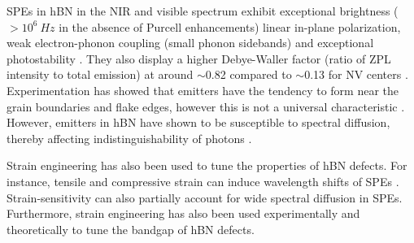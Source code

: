 \documentclass[]{article}
\begin{document}
SPEs in hBN in the NIR and visible spectrum exhibit exceptional brightness ($> 10^6  \ Hz$ in the absence of Purcell enhancements) linear in-plane polarization, weak electron-phonon coupling (small phonon sidebands) and exceptional photostability \cite{SP_sources_atomically_thin_materials_review}. They also display a higher Debye-Waller factor (ratio of ZPL intensity to total emission) at around $\sim$0.82 compared to $\sim$0.13 for NV centers \cite{2D_materials_for_quantum_information_science}. Experimentation has showed that emitters have the tendency to form near the grain boundaries and flake edges, however this is not a universal characteristic \cite{SP_sources_atomically_thin_materials_review}. However, emitters in hBN have shown to be susceptible to spectral diffusion, thereby affecting indistinguishability of photons \cite{SP_sources_atomically_thin_materials_review}.
\newline


Strain engineering has also been used to tune the properties of hBN defects. For instance, tensile and compressive strain can induce wavelength shifts of SPEs \cite{SP_sources_atomically_thin_materials_review}. Strain-sensitivity can also partially account for wide spectral diffusion in SPEs. Furthermore, strain engineering has also been used experimentally \cite{tunable_bandgap_2d_hBN} and theoretically \cite{first_principles_strain_induced_energy_gaps_BN_graphene_bilayers} to tune the bandgap of hBN defects.
\end{document}
